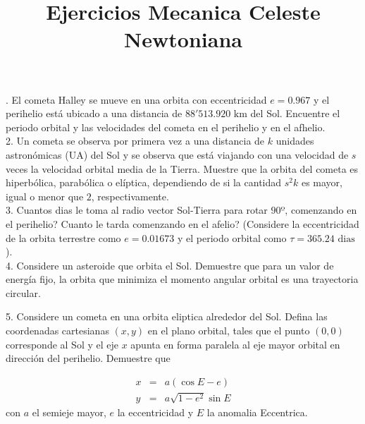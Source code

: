 \documentclass[english]{article}
\begin{document}
\title{Ejercicios Mecanica Celeste Newtoniana}

. El cometa Halley se mueve en una orbita con eccentricidad $e=0.967$
y el perihelio está ubicado a una distancia de $88'513.920\mbox{ km}$
del Sol. Encuentre el periodo orbital y las velocidades del cometa
en el perihelio y en el afhelio.\\


2. Un cometa se observa por primera vez a una distancia de $k$ unidades
astronómicas (UA) del Sol y se observa que está viajando con una velocidad
de $s$ veces la velocidad orbital media de la Tierra. Muestre que
la orbita del cometa es hiperbólica, parabólica o elíptica, dependiendo
de si la cantidad $s^{2}k$ es mayor, igual o menor que $2$, respectivamente.\\


3. Cuantos dias le toma al radio vector Sol-Tierra para rotar $90\text{º}$,
comenzando en el perihelio? Cuanto le tarda comenzando en el afelio?
(Considere la eccentricidad de la orbita terrestre como $e=0.01673$
y el periodo orbital como $\tau=365.24\mbox{ dias}$).\\


4. Considere un asteroide que orbita el Sol. Demuestre que para un
valor de energía fijo, la orbita que minimiza el momento angular orbital
es una trayectoria circular.

5. Considere un cometa en una orbita eliptica alrededor del Sol. Defina
las coordenadas cartesianas $\left(x,y\right)$ en el plano orbital,
tales que el punto $\left(0,0\right)$ corresponde al Sol y el eje
$x$ apunta en forma paralela al eje mayor orbital en dirección del
perihelio. Demuestre que

\begin{eqnarray*}
x & = & a\left(\cos E-e\right)\\
y & = & a\sqrt{1-e^{2}}\sin E
\end{eqnarray*}
con $a$ el semieje mayor, $e$ la eccentricidad y $E$ la anomalia
Eccentrica.
\end{document}
